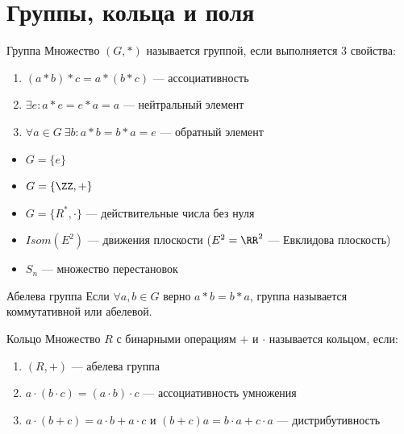\section{Группы, кольца и поля}

\begin{defn}{Группа}{}
    Множество \( (G, *) \) называется группой, если выполняется \( 3 \) свойства:
    \begin{enumerate}
        \item
            \( (a * b) * c = a * (b * c) \) --- ассоциативность
        \item
            \( \exists e : a * e = e * a = a \) --- нейтральный элемент
        \item
            \( \forall a \in G \ \exists b : a * b = b * a = e \) --- обратный элемент
    \end{enumerate}
\end{defn}

\begin{example}{}{}
    \begin{itemize}
        \item
            \( G = \{ e \} \)
        \item
            \( G = \{ \ZZ, + \} \)
        \item
            \( G = \{ R^*, \cdot \} \) --- действительные числа без нуля
        \item
            \( Isom(E^2) \) --- движения плоскости (\( E^2 = \RR^2 \) --- Евклидова плоскость)
        \item
            \( S_n \) --- множество перестановок
    \end{itemize}
\end{example}

\begin{defn}{Абелева группа}{}
    Если \( \forall a, b \in G \) верно \( a * b = b * a \), группа называется коммутативной или абелевой.
\end{defn}

\begin{defn}{Кольцо}{}
    Множество \( R \) с бинарными операциям \( + \) и \( \cdot \) называется кольцом, если:
    \begin{enumerate}
        \item
            \( (R, +) \) --- абелева группа
        \item
            \( a \cdot (b \cdot c) = (a \cdot b) \cdot c \) --- ассоциативность умножения
        \item
            \( a \cdot (b + c) = a \cdot b + a \cdot c \) и \( (b + c) a = b \cdot a + c \cdot a \) --- дистрибутивность
    \end{enumerate}
\end{defn}

